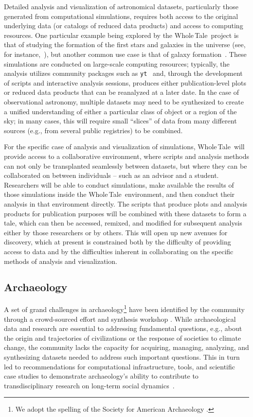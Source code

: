 \documentclass{elsarticle}
\newcommand{\wt}{Whole\,Tale}
\begin{document}
Detailed analysis and visualization of astronomical datasets, particularly those generated from computational simulations, requires both access to the original underlying data (or catalogs of reduced data products) and access to computing resources.  One particular example being explored by the \wt\ project is that of studying the formation of the first stars and galaxies in the universe (see, for instance,~\cite{2015MNRAS.452.2822S}), but another common use case is that of galaxy formation~\citep{2014ApJS..210...14K}.  These simulations are conducted on large-scale computing resources; typically, the analysis utilizes community packages such as \texttt{yt}~\citep{2011ApJS..192....9T} and, through the development of scripts and interactive analysis sessions, produces either publication-level plots or reduced data products that can be reanalyzed at a later date.  In the case of observational astronomy, multiple datasets may need to be synthesized to create a unified understanding of either a particular class of object or a region of the sky; in many cases, this will require small ``slices'' of data from many different sources (e.g., from several public registries) to be combined.

For the specific case of analysis and visualization of simulations, \wt\ will provide access to a collaborative environment, where scripts and analysis methods can not only be transplanted seamlessly between datasets, but where they can be collaborated on between individuals -- such as an advisor and a student.  Researchers will be able to conduct simulations, make available the results of those simulations inside the \wt\ environment, and then conduct their analysis in that environment directly.  The scripts that produce plots and analysis products for publication purposes will be combined with these datasets to form a tale, which can then be accessed, remixed, and modified for subsequent analysis either by those researchers or by others.  This will open up new avenues for discovery, which at present is constrained both by the difficulty of providing access to data and by the difficulties inherent in collaborating on the specific methods of analysis and visualization.

\subsection{Archaeology}


A set of grand challenges in archaeology\footnote{We adopt the spelling of the Society for American Archaeology \cite{little06}.}
 have been identified by the community through a crowd-sourced effort and synthesis workshop \cite{kintigh2014granda}. While archaeological data and research are essential to addressing fundamental questions, e.g., about the origin and trajectories of civilizations or the response of societies to climate change, the community lacks the capacity for acquiring, managing, analyzing, and synthesizing datasets needed to address such important questions. This in turn led to recommendations for computational infrastructure, tools, and scientific case studies to demonstrate archaeology's ability to contribute to transdisciplinary research on long-term social dynamics~\cite{kintigh2015cultural}. 
\end{document}
